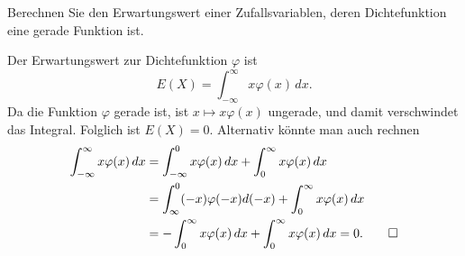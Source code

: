 Berechnen Sie den Erwartungswert einer Zufallsvariablen, deren
Dichtefunktion eine gerade Funktion ist.

\begin{loesung}
Der Erwartungswert zur Dichtefunktion $\varphi$ ist
\[
E(X)=\int_{-\infty}^\infty x\varphi(x)\,dx.
\]
Da die Funktion $\varphi$ gerade ist, ist $x\mapsto x\varphi(x)$
ungerade, und damit verschwindet das Integral. Folglich ist $E(X)=0$.
Alternativ könnte man auch rechnen
\begin{align*}
\int_{-\infty}^\infty x\varphi(x)\,dx
&=\int_{-\infty}^0x\varphi(x)\,dx +\int_0^\infty x\varphi(x)\,dx\\
&=\int_{\infty}^0(-x)\varphi(-x)d(-x)+\int_0^\infty x\varphi(x)\,dx\\
&=-\int_0^{\infty}x\varphi(x)\,dx+\int_0^\infty x\varphi(x)\,dx=0.
\qedhere
\end{align*}
\end{loesung}

